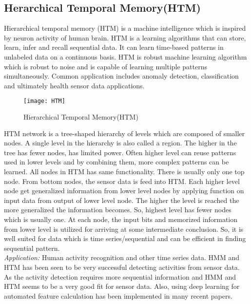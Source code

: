 \documentclass[conference]{IEEEtran}
\begin{document}
\subsection{Herarchical Temporal Memory(HTM)}
Hierarchical temporal memory (HTM) is a machine intelligence which is inspired by neuron activity of  human brain. HTM is a learning algorithms that can store, learn, infer and recall sequential data. It can learn time-based patterns in unlabeled data on a continuous basis. HTM is robust machine learning algorithm which is robust to noise and is capable of learning multiple patterns simultaneously.  Common application includes anomaly detection, classification and ultimately health sensor data applications.
\begin{figure}[h]
\begin{center}
\texttt{[image: HTM]}
\end{center}
\caption{Hierarchical Temporal Memory(HTM)}
\end{figure}
HTM network is a tree-shaped hierarchy of levels which are composed of smaller nodes. A single level in the hierarchy is also called a region. The higher in the tree has fewer nodes, has limited power. Often higher level can reuse patterns used in lower levels and by combining them, more complex patterns can be learned.
All nodes in HTM has same functionality. There is usually only one top node. From bottom nodes, the sensor data is feed into HTM. Each higher level node get generalized information from lower level nodes by applying function on input data from output of lower level node. The higher the level is reached the more generalized the information becomes. So, highest level has fewer nodes which is usually one. At each node, the input bits and memorized information from lower level is utilized for arriving at some intermediate conclusion. So, it is well suited for data which is time series/sequential and can be efficient in finding sequential pattern.\\
\emph{Application: }Human activity recognition and other time series data. HMM and HTM has been seen to be very successful detecting activities from sensor data. As the activity detection requires more sequential information and HMM and HTM seems to be a very good fit for sensor data. Also, using deep learning for automated feature calculation has been implemented in many recent papers.
\end{document}
